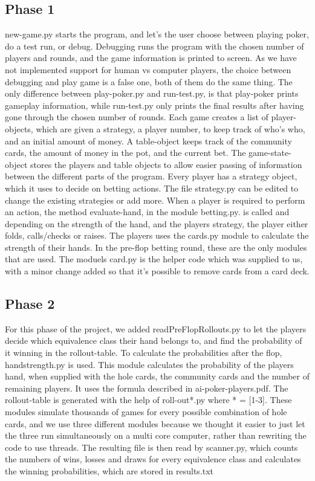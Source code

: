 \documentclass[titlepage]{article}
\begin{document}
	\subsection{Phase 1}
		new-game.py starts the program, and let's the user choose between playing poker, do a test run, or debug. Debugging runs the program with the chosen number of players and rounds, and the game information is printed to screen. As we have not implemented support for human vs computer players, the choice between debugging and play game is a false one, both of them do the same thing. The only difference between play-poker.py and run-test.py, is that play-poker prints gameplay information, while run-test.py only prints the final results after having gone through the chosen number of rounds. Each game creates a list of player-objects, which are given a strategy, a player number, to keep track of who's who, and an initial amount of money. A table-object keeps track of the community cards, the amount of money in the pot, and the current bet. The game-state-object stores the players and table objects to allow easier passing of information between the different parts of the program. Every player has a strategy object, which it uses to decide on betting actions. The file strategy.py can be edited to change the existing strategies or add more. When a player is required to perform an action, the method evaluate-hand, in the module betting.py. is called and depending on the strength of the hand, and the players strategy, the player either folds, calls/checks or raises. The players uses the cards.py module to calculate the strength of their hands. In the pre-flop betting round, these are the only modules that are used. The moduels card.py is the helper code which was supplied to us, with a minor change added so that it's possible to remove cards from a card deck.
		
	\subsection{Phase 2}
		For this phase of the project, we added readPreFlopRollouts.py to let the players decide which equivalence class their hand belongs to, and find the probability of it winning in the rollout-table. To calculate the probabilities after the flop, handstrength.py is used. This module calculates the probability of the players hand, when supplied with the hole cards, the community cards and the number of remaining players. It uses the formula described in ai-poker-players.pdf. The rollout-table is generated with the help of roll-out*.py where * = [1-3]. These modules simulate thousands of games for every possible combination of hole cards, and we use three different modules because we thought it easier to just let the three run simultaneously on a multi core computer, rather than rewriting the code to use threads. The resulting file is then read by scanner.py, which counts the numbers of wins, losses and draws for every equivalence class and calculates the winning probabilities, which are stored in results.txt
\end{document}
